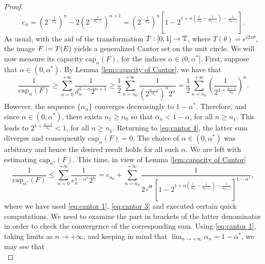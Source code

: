 \documentclass[12pt]{amsart}
\theoremstyle{definition}\newtheorem{remark}[theorem]{Remark}
\theoremstyle{definition}\newtheorem{example}[theorem]{Example}
\theoremstyle{definition}\newtheorem{definition}{Definition}
\numberwithin{equation}{section}
\newcommand\TT{{\mathbb T}}
\begin{document}
\begin{proof}
    \begin{equation}\label{eq:cantor 3}
        e_n=\left(2^{-\frac{1}{\alpha_{n}}}\right)^{n}-2\left(2^{-\frac{1}{\alpha_{n+1}}}\right)^{n+1}=\left(2^{-\frac{1}{\alpha_{n}}}\right)^{n}\left[1-2^{1+n\left(\frac{1}{\alpha_{n}}-\frac{1}{\alpha_{n+1}}\right)-\frac{1}{\alpha_{n+1}}}\right].
    \end{equation}
    As usual, with the aid of the transformation $T\vcentcolon[0,1]\to\TT$, where $T(\theta)=e^{i2\pi\theta}$, the image $F\vcentcolon=T(E)$ yields a generalized Cantor set on the unit circle. We will now measure its capacity $\mathrm{cap}_\alpha(F)$, for the indices $\alpha\in(0,\alpha^*]$. First, suppose that $\alpha\in(0,\alpha^*)$. By Lemma \ref{lem:capacity of Cantor}, we have that
    \begin{equation}\label{eq:cantor 4}
        \frac{1}{\mathrm{cap}_\alpha(F)}\ge \sum_{n=0}^{+\infty}\frac{1}{d_n^{1-\alpha}2^{n+1}}\ge\frac{1}{2}\sum_{n=n_0}^{+\infty}\frac{1}{\left(2^{\frac{\alpha-1}{\alpha_n}}\right)^n2^n}=\frac{1}{2}\sum_{n=n_0}^{+\infty}\left(\frac{1}{2^{1+\frac{\alpha-1}{\alpha_n}}}\right)^n.
    \end{equation}
    However, the sequence $\{\alpha_n\}$ converges decreasingly to $1-\alpha^*$. Therefore, and since $\alpha\in(0,\alpha^*)$, there exists $n_1\ge n_0$ so that $\alpha_n<1-\alpha$, for all $n\ge n_1$. This leads to $2^{1+\frac{\alpha-1}{\alpha_n}}<1$, for all $n\ge n_1$. Returning to \eqref{eq:cantor 4}, the latter sum diverges and consequently $\mathrm{cap}_\alpha(F)=0$. The choice of $\alpha\in(0,\alpha^*)$ was arbitrary and hence the desired result holds for all such $\alpha$. We are left with estimating $\mathrm{cap}_{\alpha^*}(F)$. This time, in view of Lemma \ref{lem:capacity of Cantor}
    \begin{equation}\label{eq:cantor 5}
    \frac{1}{\mathrm{cap}_{\alpha^*}(F)} \le \sum_{n=0}^{+\infty}\frac{1}{e_n^{1-\alpha^*}2^n}=c_{n_0}+\sum_{n=n_0}^{+\infty}\frac{1}{2^{\sqrt{n}}\left[1-2^{1+n\left(\frac{1}{\alpha_n}-\frac{1}{\alpha_{n+1}}\right)-\frac{1}{\alpha_{n+1}}}\right]^{1-\alpha^*}},
    \end{equation}
    where we have used \eqref{eq:cantor 1}, \eqref{eq:cantor 3} and executed certain quick computations. We need to examine the part in brackets of the latter denominator in order to check the convergence of the corresponding sum. Using \eqref{eq:cantor 1}, taking limits as $n\to+\infty$, and keeping in mind that $\lim_{n\to+\infty}\alpha_n=1-\alpha^*$, we may see that
    \begin{equation*}

\end{equation*}
\end{proof}
\end{document}
